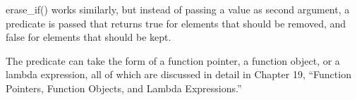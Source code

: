 erase\_if() works similarly, but instead of passing a value as second argument, a predicate is passed that returns true for elements that should be removed, and false for elements that should be kept.

The predicate can take the form of a function pointer, a function object, or a lambda expression, all of which are discussed in detail in Chapter 19, “Function Pointers, Function Objects, and Lambda Expressions.”























